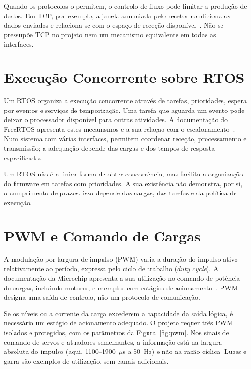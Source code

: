 Quando os protocolos o permitem, o controlo de fluxo pode limitar a
produção de dados. Em TCP, por exemplo, a janela anunciada pelo recetor
condiciona os dados enviados e relaciona-se com o espaço de receção
disponível~\cite[sec.~3.8.6]{eddy_tcp_2022}. Não se pressupõe TCP no
projeto nem um mecanismo equivalente em todas as interfaces.

\section{Execução Concorrente sobre RTOS}
\label{sec:rtos}

Um RTOS organiza a execução concorrente através de tarefas, prioridades,
espera por eventos e serviços de temporização. Uma tarefa que aguarda
um evento pode deixar o processador disponível para outras atividades.
A documentação do FreeRTOS apresenta estes mecanismos e a sua relação
com o escalonamento~\cite[cap.~3]{barry_freertos_2016}. Num sistema com
várias interfaces, permitem coordenar receção, processamento e transmissão;
a adequação depende das cargas e dos tempos de resposta especificados.

Um RTOS não é a única forma de obter concorrência, mas facilita a
organização do firmware em tarefas com prioridades. A sua existência não
demonstra, por si, o cumprimento de prazos: isso depende das cargas, das
tarefas e da política de execução.

\section{PWM e Comando de Cargas}
\label{sec:pwm}

A modulação por largura de impulso (PWM) varia a duração do impulso ativo
relativamente ao período, expressa pelo ciclo de trabalho
(\textit{duty cycle}). A documentação da Microchip apresenta a sua
utilização no comando de potência de cargas, incluindo motores, e
exemplos com estágios de acionamento~\cite{microchip_tips_2009}.
PWM designa uma saída de controlo, não um protocolo de comunicação.

Se os níveis ou a corrente da carga excederem a capacidade da saída
lógica, é necessário um estágio de acionamento adequado. O projeto
requer três PWM isolados e protegidos, com os parâmetros da
Figura~\ref{fig:pwm}. Nos sinais de comando de servos e atuadores
semelhantes, a informação está na largura absoluta do impulso (aqui,
1100--1900~$\mu$s a 50~Hz) e não na razão cíclica.
Luzes e garra são exemplos de utilização, sem canais adicionais.

